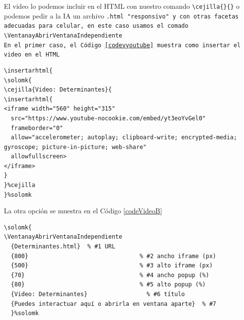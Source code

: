\documentclass[fleqn,oneside]{article}
\begin{document}
El video lo podemos incluir en el HTML con nuestro comando \lstinline+\cejilla{}{}+ o podemos pedir a la IA un archivo \tt{.html} "responsivo" y con otras facetas adecuadas para celular, en este caso usamos el comado \lstinline+\VentanayAbrirVentanaIndependiente+\\


En el primer caso, el Código \ref{codevyoutube} muestra como insertar el video en el HTML

\bigskip
\bigskip\begin{lstlisting}[caption={El determinante: Video de YouTube},label={codevyoutube}]
% Esto no abre desde  una PC, debe estar en un sitio web
\insertarhtml{
\solomk{
\cejilla{Video: Determinantes}{
\insertarhtml{
<iframe width="560" height="315"
  src="https://www.youtube-nocookie.com/embed/yt3eoYvGel0"
  frameborder="0"
  allow="accelerometer; autoplay; clipboard-write; encrypted-media; gyroscope; picture-in-picture; web-share"
  allowfullscreen>
</iframe>
}
}%cejilla
}%solomk
\end{lstlisting}



\bigskip
La otra opción se muestra en el  Código \ref{codeVideoB} \\

\bigskip
\bigskip\begin{lstlisting}[caption={Video sobre determinantes},label={codeVideoB}]
\solomk{
\VentanayAbrirVentanaIndependiente
  {Determinantes.html}  % #1 URL
  {800}                                % #2 ancho iframe (px)
  {500}                                % #3 alto iframe (px)
  {70}                                 % #4 ancho popup (%)
  {80}                                 % #5 alto popup (%)
  {Video: Determinantes}                 % #6 título
  {Puedes interactuar aquí o abrirla en ventana aparte}  % #7
  }%solomk
\end{lstlisting}

\bigskip
{}%
\end{document}
